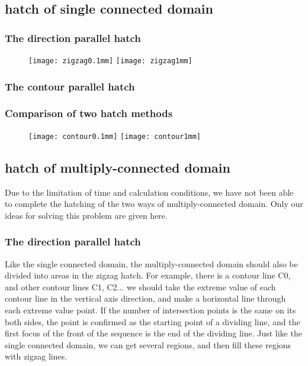 \documentclass{apmcmthesis}
\begin{document}
\subsection{hatch of single connected domain}


\subsubsection{The direction parallel hatch}


\begin{figure}[!ht]
  \centering
  \texttt{[image: zigzag0.1mm]} \quad \texttt{[image: zigzag1mm]}
  \caption{}
  \caption{}
\end{figure}



\subsubsection{The contour parallel hatch}

\subsubsection{Comparison of two hatch methods}

\begin{figure}[!ht]
  \centering
  \texttt{[image: contour0.1mm]} \quad \texttt{[image: contour1mm]}
  \caption{}
  \caption{}
\end{figure}

\subsection{hatch of multiply-connected domain}

Due to the limitation of time and calculation conditions, we have not been able to complete the hatching of the two ways of multiply-connected domain. Only our ideas for solving this problem are given here.

\subsubsection{The direction parallel hatch}

 Like the single connected domain, the multiply-connected domain should also be divided into areas in the zigzag hatch. For example, there is a contour line C0, and other contour lines C1, C2... we should take the extreme value of each contour line in the vertical axis direction, and make a horizontal line through each extreme value point. If the number of intersection points is the same on its both sides, the point is confirmed as the starting point of a dividing line, and the first focus of the front of the sequence is the end of the dividing line. Just like the single connected domain, we can get several regions, and then fill these regions with zigzag lines.
\end{document}
